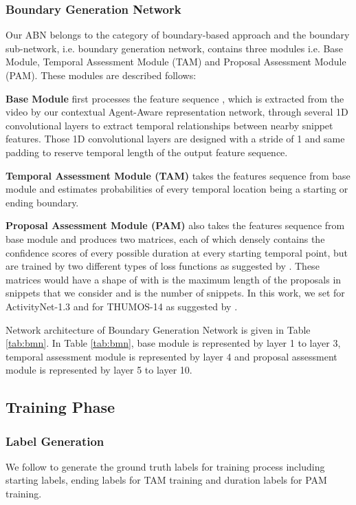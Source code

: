 \documentclass{ieeeaccess}
\begin{document}
\subsubsection{Boundary Generation Network}
\label{subsec:BMN}

Our ABN belongs to the category of boundary-based approach and the boundary sub-network, i.e.  boundary generation network, contains three modules i.e. Base Module, Temporal Assessment Module (TAM) and Proposal Assessment Module (PAM). These modules are described follows:

\textbf{Base Module}
first processes the feature sequence , which is extracted from the video by our contextual Agent-Aware representation network, through several 1D convolutional layers to extract temporal relationships between nearby snippet features. Those 1D convolutional layers are designed with a stride of 1 and same padding to reserve temporal length of the output feature sequence.

\textbf{Temporal Assessment Module (TAM)}
takes the features sequence from base module and estimates probabilities of every temporal location being a starting or ending boundary.

\textbf{Proposal Assessment Module (PAM)}
also takes the features sequence from base module and produces two matrices, each of which densely contains the confidence scores of every possible duration at every starting temporal point, but are trained by two different types of loss functions as suggested by \cite{bmn}. These matrices would have a shape of  with  is the maximum length of the proposals in snippets that we consider and  is the number of snippets. In this work, we set  for ActivityNet-1.3 \cite{caba2015activitynet} and  for THUMOS-14 \cite{THUMOS14} as suggested by \cite{bmn}.

Network architecture of Boundary Generation Network is given in Table \ref{tab:bmn}. In Table \ref{tab:bmn}, base module is represented by layer 1 to layer 3, temporal assessment module is represented by layer 4 and proposal assessment module is represented by layer 5 to layer 10.




\subsection{Training Phase}

\subsubsection{Label Generation}
We follow \cite{bmn, lin2018bsn} to generate the ground truth labels for training process including starting labels, ending labels for TAM training and duration labels for PAM training.
\end{document}
